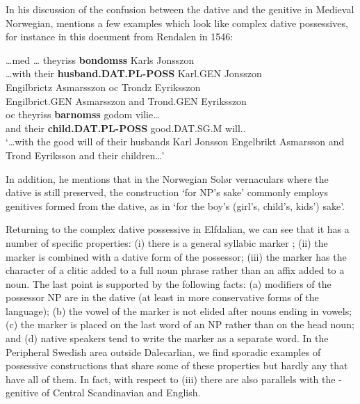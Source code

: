 In his discussion of the confusion between the dative and the genitive in Medieval Norwegian, \citet{Larsen1895} mentions a few examples which look like complex dative possessives, for instance in this document from Rendalen in 1546:

\ea\label{}
\gll …med  …  theyriss  \textbf{bondomss} Karls  Jonsszon\\
…with    their  \textbf{husband.DAT.PL-POSS} Karl.GEN  Jonsszon\\
\gll Engilbrictz  Asmarsszon  oc  Trondz  Eyriksszon\\
Engilbrict.GEN  Asmarsszon  and  Trond.GEN   Eyriksszon\\
\gll oc  theyriss  \textbf{barnomss}  godom  vilie…\\
and  their  \textbf{child.DAT.PL-POSS} good.DAT.SG.M  will..\\
\glt ‘…with the good will of their husbands Karl Jonsson Engelbrikt Asmarsson and Trond Eyriksson and their children…’
\z

In addition, he mentions that in the Norwegian Solør vernaculars where the dative is still preserved, the construction ‘for NP’s sake’ commonly employs genitives formed from the dative, as in  ‘for the boy’s (girl’s, child’s, kids’) sake’. 

Returning to the complex dative possessive in Elfdalian, we can see that it has a number of specific properties: (i) there is a general syllabic marker ; (ii) the marker is combined with a dative form of the possessor; (iii) the marker has the character of a clitic added to a full noun phrase rather than an affix added to a noun. The last point is supported by  the following facts: (a) modifiers of the possessor NP are in the dative (at least in more conservative forms of the language); (b) the vowel of the marker is not elided after nouns ending in vowels; (c) the marker is placed on the last word of an NP rather than on the head noun; and (d) native speakers tend to write the marker as a separate word. In the Peripheral Swedish area outside Dalecarlian, we find sporadic examples of possessive constructions that share some of these properties but hardly any that have all of them. In fact, with respect to (iii) there are also parallels with the -genitive of Central Scandinavian and English. 

